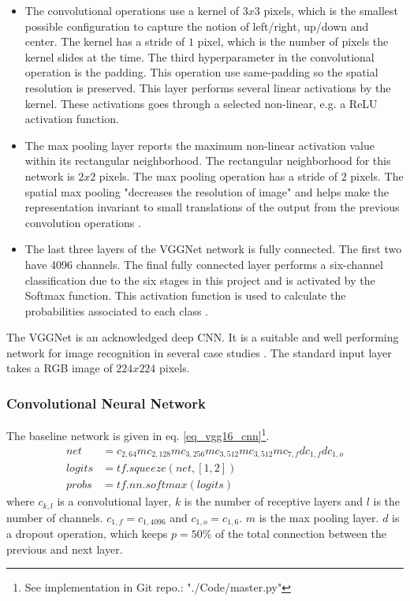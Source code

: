 \begin{itemize}
\item The convolutional operations use a kernel of $3x3$ pixels, which is the smallest possible configuration to capture the notion of left/right, up/down and center. The kernel has a stride of $1$ pixel, which is the number of pixels the kernel slides at the time.
The third hyperparameter in the convolutional operation is the padding. This operation use same-padding so the spatial resolution is preserved. This layer performs several linear activations by the kernel. These activations goes through a selected non-linear, e.g. a ReLU activation function.
\item The max pooling layer reports the maximum non-linear activation value within its rectangular neighborhood. The rectangular neighborhood for this network is $2x2$ pixels. The max pooling operation has a stride of $2$ pixels. The spatial max pooling "decreases the resolution of image" and helps make the representation invariant to small translations of the output from the previous convolution operations \cite[sec. 9]{dl_book}.
	\item The last three layers of the VGGNet network is fully connected. The first two have 4096 channels. The final fully connected layer performs a six-channel classification due to the six stages in this project and is activated by the Softmax function. This activation function is used to calculate the probabilities associated to each class \cite[eq. 4.1]{dl_book}.  
\end{itemize}
The VGGNet is an acknowledged deep CNN. It is a suitable and well performing network for image recognition in several case studies \cite{VGGnet16, stand_cnn_notes}.  
The standard input layer takes a RGB image of $224x224$ pixels.


\subsubsection{Convolutional Neural Network}

The baseline network is given in eq. \ref{eq_vgg16_cnn}\footnote{See implementation in Git repo.: "./Code/master.py"}. 
\begin{equation}
\begin{aligned}
net &= c_{2,64}mc_{2,128}mc_{3,256}mc_{3,512}mc_{3,512}m c_{7,f} d c_{1, f} dc_{1,o}	\\
logits &= tf.squeeze(net, [1, 2])\\
probs &= tf.nn.softmax(logits)
\end{aligned}
\label{eq_vgg16_cnn}
\end{equation}
where $c_{k,l}$ is a convolutional layer, $k$ is the number of receptive layers and $l$ is the number of channels. $c_{1,f} = c_{1,4096}$ and $c_{1,o} = c_{1,6}$.
$m$ is the max pooling layer. $d$ is a dropout operation, which keeps  $p = 50\%$ of the total connection between the previous and next layer. 

